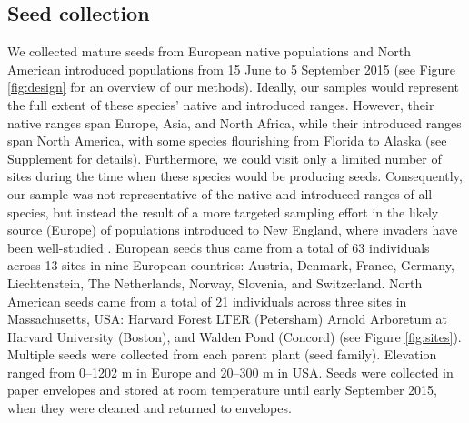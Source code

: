 \documentclass[11pt]{article}\usepackage[]{graphicx}\usepackage[]{color}
\begin{document}
	\subsection{Seed collection} 
	We collected mature seeds from European native populations and North American introduced populations from 15 June to 5 September 2015 (see Figure \ref{fig:design} for an overview of our methods). Ideally, our samples would represent the full extent of these species' native and introduced ranges. However, their native ranges span Europe, Asia, and North Africa, while their introduced ranges span North America, with some species flourishing from Florida to Alaska (see Supplement for details). Furthermore, we could visit only a limited number of sites during the time when these species would be producing seeds. Consequently, our sample was not representative of the native and introduced ranges of all species, but instead the result of a more targeted sampling effort in the likely source (Europe) of populations introduced to New England, where invaders have been well-studied \parencite{Willis:2008bf}. European seeds thus came from a total of 63 individuals across 13 sites in nine European countries: Austria, Denmark, France, Germany, Liechtenstein, The Netherlands, Norway, Slovenia, and Switzerland. North American seeds came from a total of 21 individuals across three sites in Massachusetts, USA: Harvard Forest LTER (Petersham) Arnold Arboretum at Harvard University (Boston), and Walden Pond (Concord) (see Figure \ref{fig:sites}). Multiple seeds were collected from each parent plant (seed family). Elevation ranged from 0--1202 m in Europe and 20--300 m in USA. Seeds were collected in paper envelopes and stored at room temperature until early September 2015, when they were cleaned and returned to envelopes. %
	
\end{document}
